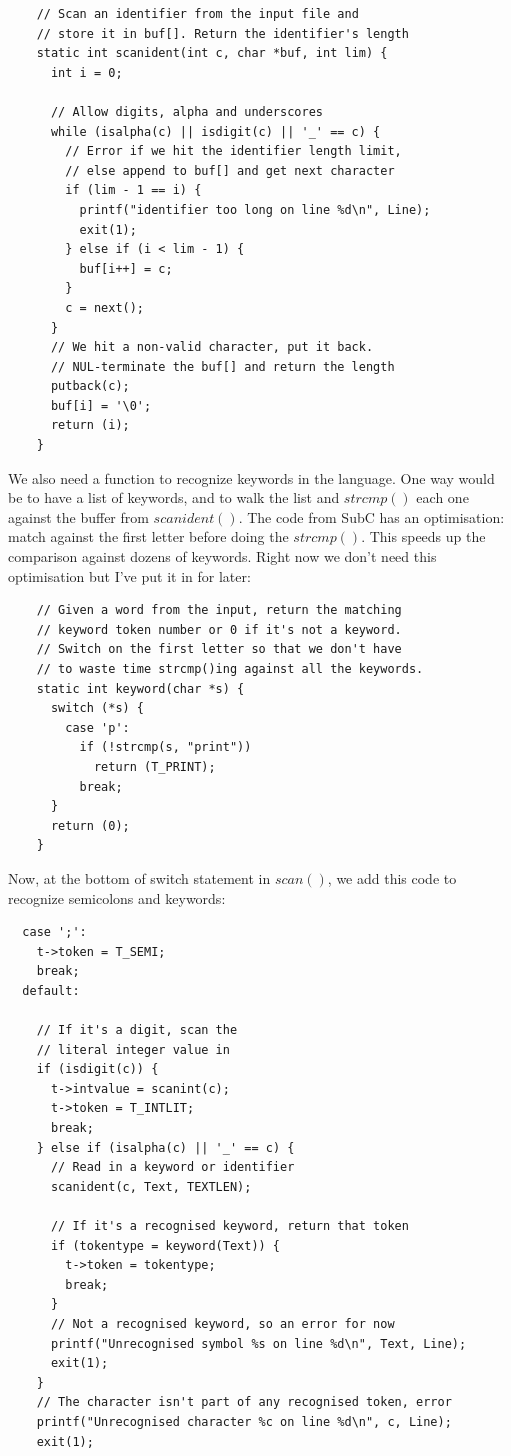 \documentclass[journal, onecolumn, 12pt]{IEEEtran}
\begin{document}
\begin{lstlisting}
    // Scan an identifier from the input file and
    // store it in buf[]. Return the identifier's length
    static int scanident(int c, char *buf, int lim) {
      int i = 0;
    
      // Allow digits, alpha and underscores
      while (isalpha(c) || isdigit(c) || '_' == c) {
        // Error if we hit the identifier length limit,
        // else append to buf[] and get next character
        if (lim - 1 == i) {
          printf("identifier too long on line %d\n", Line);
          exit(1);
        } else if (i < lim - 1) {
          buf[i++] = c;
        }
        c = next();
      }
      // We hit a non-valid character, put it back.
      // NUL-terminate the buf[] and return the length
      putback(c);
      buf[i] = '\0';
      return (i);
    }
\end{lstlisting}

We also need a function to recognize keywords in the language. One way would be to have a list of keywords, and to walk the list and $strcmp()$ each one against the buffer from $scanident()$. The code from SubC has an optimisation: match against the first letter before doing the $strcmp()$. This speeds up the comparison against dozens of keywords. Right now we don't need this optimisation but I've put it in for later:

\begin{lstlisting}
    // Given a word from the input, return the matching
    // keyword token number or 0 if it's not a keyword.
    // Switch on the first letter so that we don't have
    // to waste time strcmp()ing against all the keywords.
    static int keyword(char *s) {
      switch (*s) {
        case 'p':
          if (!strcmp(s, "print"))
            return (T_PRINT);
          break;
      }
      return (0);
    }
\end{lstlisting}

Now, at the bottom of switch statement in $scan()$, we add this code to recognize semicolons and keywords:

\begin{lstlisting}
  case ';':
    t->token = T_SEMI;
    break;
  default:

    // If it's a digit, scan the
    // literal integer value in
    if (isdigit(c)) {
      t->intvalue = scanint(c);
      t->token = T_INTLIT;
      break;
    } else if (isalpha(c) || '_' == c) {
      // Read in a keyword or identifier
      scanident(c, Text, TEXTLEN);

      // If it's a recognised keyword, return that token
      if (tokentype = keyword(Text)) {
        t->token = tokentype;
        break;
      }
      // Not a recognised keyword, so an error for now
      printf("Unrecognised symbol %s on line %d\n", Text, Line);
      exit(1);
    }
    // The character isn't part of any recognised token, error
    printf("Unrecognised character %c on line %d\n", c, Line);
    exit(1);
\end{lstlisting}
\end{document}
